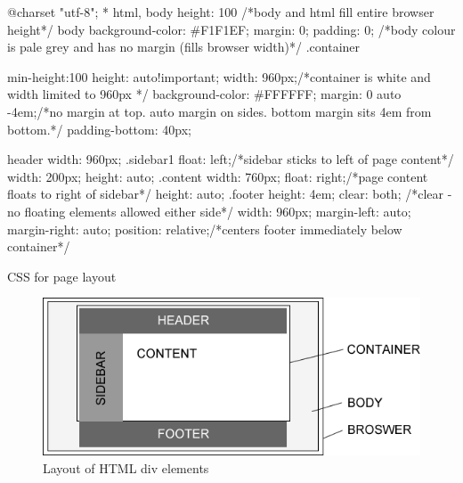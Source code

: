 \documentclass[11pt]{article}
\begin{document}
\begin{code}[ht]
\begin{css}
@charset "utf-8";
*{
}
html, body {
	height: 100%
    /*body and html fill entire browser height*/
}
body {
	background-color: #F1F1EF;
	margin: 0;
	padding: 0;
    /*body colour is pale grey and has no margin (fills browser width)*/
}
.container {
	min-height:100%
	height: auto!important;
	width: 960px;/*container is white and width limited to 960px */
	background-color: #FFFFFF;
	margin: 0 auto -4em;/*no margin at top. auto margin on sides. bottom margin sits 4em from bottom.*/
	padding-bottom: 40px;
    
}
header {
	width: 960px;
}
.sidebar1 {
	float: left;/*sidebar sticks to left of page content*/
	width: 200px;
	height: auto;
}
.content {
	width: 760px;
	float: right;/*page content floats to right of sidebar*/
	height: auto;
}
.footer {
	height: 4em;
	clear: both; /*clear - no floating elements allowed either side*/
	width: 960px;
	margin-left: auto;
	margin-right: auto;
	position: relative;/*centers footer immediately below container*/
}
\end{css}
\caption{CSS for page layout}
\label{code:cssGeneral}
\end{code}


\begin{figure}[ht]
\begin{center}
\includegraphics[scale=0.5]{pageLayout}
\caption{Layout of HTML div elements}
\label{fig:pageLayout}
\end{center}
\end{figure}

\end{document}
